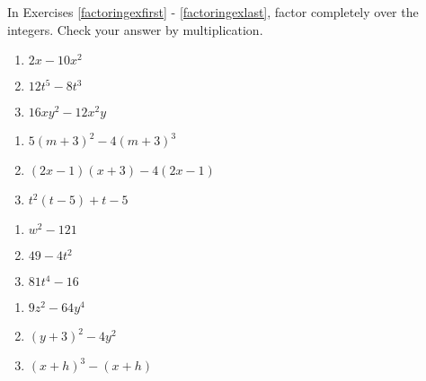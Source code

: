 \documentclass{ximera}
\begin{document}
	\author{Stitz-Zeager}


\label{ExercisesforAppFactoring}

In Exercises \ref{factoringexfirst} - \ref{factoringexlast}, factor completely over the integers.  Check your answer by multiplication.

\begin{multicols}{3}
\begin{enumerate}

\item $2x - 10x^2$ \label{factoringexfirst}
\item $12t^5 - 8t^3$
\item $16xy^2 - 12x^2y$

\setcounter{HW}{\value{enumi}}
\end{enumerate}
\end{multicols}

\begin{multicols}{3}
\begin{enumerate}
\setcounter{enumi}{\value{HW}}

\item $5(m+3)^2- 4(m+3)^3$
\item $(2x-1)(x+3) - 4(2x-1)$
\item $t^2(t-5) + t - 5$

\setcounter{HW}{\value{enumi}}
\end{enumerate}
\end{multicols}

\begin{multicols}{3}
\begin{enumerate}
\setcounter{enumi}{\value{HW}}

\item $w^2 - 121$
\item $49 - 4t^2$
\item $81t^4 - 16$

\setcounter{HW}{\value{enumi}}
\end{enumerate}
\end{multicols}

\begin{multicols}{3}
\begin{enumerate}
\setcounter{enumi}{\value{HW}}

\item $9z^2 - 64y^4$
\item $(y+3)^2 - 4y^2$
\item $(x+h)^3 - (x+h)$

\setcounter{HW}{\value{enumi}}
\end{enumerate}
\end{multicols}
\end{document}
